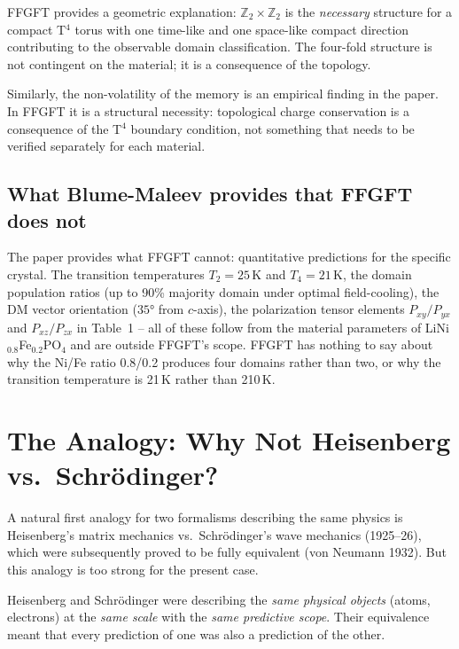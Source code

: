 FFGFT provides a geometric explanation: $\mathbb{Z}_2\times\mathbb{Z}_2$
is the \emph{necessary} structure for a compact T$^4$ torus with one
time-like and one space-like compact direction contributing to the observable
domain classification. The four-fold structure is not contingent on the
material; it is a consequence of the topology.

Similarly, the non-volatility of the memory is an empirical finding in
the paper. In FFGFT it is a structural necessity: topological charge
conservation is a consequence of the T$^4$ boundary condition, not
something that needs to be verified separately for each material.

\subsection{What Blume-Maleev provides that FFGFT does not}

The paper provides what FFGFT cannot: quantitative predictions for the
specific crystal. The transition temperatures $T_2 = 25$\,K and $T_4 = 21$\,K,
the domain population ratios (up to 90\% majority domain under optimal
field-cooling), the DM vector orientation ($35°$ from $c$-axis), the
polarization tensor elements $P_{xy}/P_{yx}$ and $P_{xz}/P_{zx}$ in
Table~1 -- all of these follow from the material parameters of
LiNi$_{0.8}$Fe$_{0.2}$PO$_4$ and are outside FFGFT's scope. FFGFT has
nothing to say about why the Ni/Fe ratio 0.8/0.2 produces four domains
rather than two, or why the transition temperature is 21\,K rather than
210\,K.

\section{The Analogy: Why Not Heisenberg vs.\ Schrödinger?}

A natural first analogy for two formalisms describing the same physics is
Heisenberg's matrix mechanics vs.\ Schrödinger's wave mechanics (1925--26),
which were subsequently proved to be fully equivalent (von Neumann 1932). But
this analogy is too strong for the present case.

Heisenberg and Schrödinger were describing the \emph{same physical objects}
(atoms, electrons) at the \emph{same scale} with the \emph{same predictive
scope}. Their equivalence meant that every prediction of one was also a
prediction of the other.

